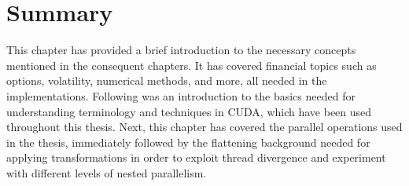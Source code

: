 \section*{Summary}

This chapter has provided a brief introduction to the necessary concepts mentioned in the consequent chapters. It has covered financial topics such as options, volatility, numerical methods, and more, all needed in the implementations. Following was an introduction to the basics needed for understanding terminology and techniques in CUDA, which have been used throughout this thesis. Next, this chapter has covered the parallel operations used in the thesis, immediately followed by the flattening background needed for applying transformations in order to exploit thread divergence and experiment with different levels of nested parallelism. 